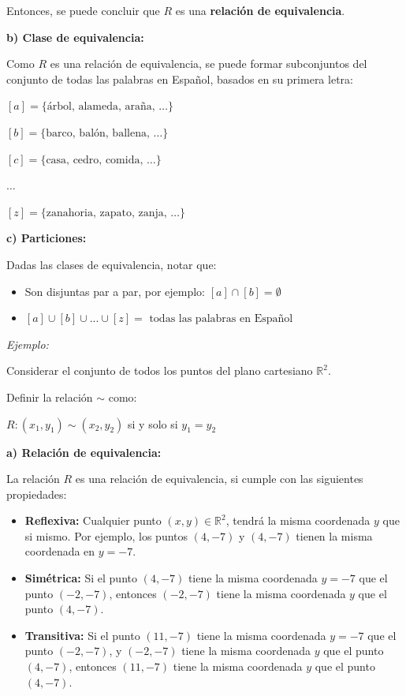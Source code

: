 \documentclass{article}
\begin{document}
Entonces, se puede concluir que $R$ es una \textbf{relación de equivalencia}.

\textbf{b) Clase de equivalencia:}

Como $R$ es una relación de equivalencia, se puede formar subconjuntos del conjunto de todas las palabras en Español, basados en su primera letra:

$\left[a\right] = \{\text{árbol, alameda, araña, }\dots\}$

$\left[b\right] = \{\text{barco, balón, ballena, }\dots\}$

$\left[c\right] = \{\text{casa, cedro, comida, }\dots\}$

$\dots$

$\left[z\right] = \{\text{zanahoria, zapato, zanja, }\dots\}$

\textbf{c) Particiones:}

Dadas las clases de equivalencia, notar que:

\begin{itemize}
    \item Son disjuntas par a par, por ejemplo: $\left[a\right] \cap \left[b\right] = \emptyset$
    \item $\left[a\right] \cup \left[b\right] \cup ... \cup \left[z\right] = \text{ todas las palabras en Español}$
\end{itemize}

\textit{Ejemplo:}

Considerar el conjunto de todos los puntos del plano cartesiano $\mathbb{R}^2$. 

Definir la relación $\sim$ como: 

$R: (x_1, y_1) \sim (x_2, y_2)$ si y solo si $y_1 = y_2$

\textbf{a) Relación de equivalencia:}

La relación $R$ es una relación de equivalencia, si cumple con las siguientes propiedades:

\begin{itemize}
    \item \textbf{Reflexiva:} Cualquier punto $(x, y) \in \mathbb{R}^2$, tendrá la misma coordenada $y$ que si mismo. Por ejemplo, los puntos $(4, -7)$ y $(4, -7)$ tienen la misma coordenada en $y = -7$.
    \item \textbf{Simétrica:} Si el punto $(4, -7)$ tiene la misma coordenada $y = -7$ que el punto $(-2, -7)$, entonces $(-2, -7)$ tiene la misma coordenada $y$ que el punto $(4, -7)$.
    \item \textbf{Transitiva:} Si el punto $(11, -7)$ tiene la misma coordenada $y = -7$ que el punto $(-2, -7)$, y $(-2, -7)$ tiene la misma coordenada $y$ que el punto $(4, -7)$, entonces $(11, -7)$ tiene la misma coordenada $y$ que el punto $(4, -7)$.
\end{itemize}
\end{document}
